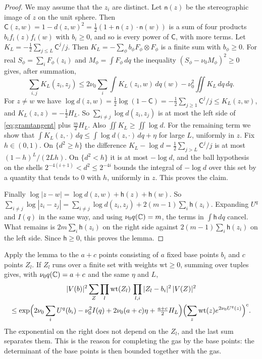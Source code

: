 \begin{proof}
We may assume that the $z_i$ are distinct. Let $\mathsf n(z)$ be the stereographic image of $z$ on the unit sphere. Then
$\mathsf C(z,w)=1-d(z,w)^2=\frac12(1+\mathsf n(z)\cdot\mathsf n(w))$ is a sum of four products $b_if_i(z)f_i(w)$ with $b_i\ge0$, and so
is every power of $\mathsf C$, with more terms. Let $K_L=-\frac12\sum_{j\le L}\mathsf C^j/j$. Then $K_L=-\sum_\phi b_\phi F_\phi\otimes F_\phi$ is a finite sum with
$b_\phi\ge0$. For real $S_\phi=\sum_iF_\phi(z_i)$ and $M_\phi=\int F_\phi\,dq$ the inequality $(S_\phi-\nu_0M_\phi)^2\ge0$ gives, after summation,
\begin{equation}\label{eq:gramtangent}
 \sum_{i,j}K_L(z_i,z_j)\le2\nu_0\sum_i\int K_L(z_i,w)\,dq(w)-\nu_0^2\iint K_L\,dq\,dq .
\end{equation}
For $z\ne w$ we have $\log d(z,w)=\frac12\log(1-\mathsf C)=-\frac12\sum_{j\ge1}\mathsf C^j/j\le K_L(z,w)$, and $K_L(z,z)=-\frac12H_L$. So
$\sum_{i\ne j}\log d(z_i,z_j)$ is at most the left side of \eqref{eq:gramtangent} plus $\frac m2H_L$. Also $\iint K_L\ge\iint\log d$. For the
remaining term we show that $\int K_L(z,\cdot)\,dq\le\int\log d(z,\cdot)\,dq+\eta$ for large $L$, uniformly in $z$. Fix $h\in(0,1)$.
On $\{d^2\ge h\}$ the difference $K_L-\log d=\frac12\sum_{j>L}\mathsf C^j/j$ is at most $(1-h)^L/(2Lh)$. On $\{d^2<h\}$ it is at most $-\log d$, and
the ball hypothesis on the shells $2^{-4(i+1)}<d^2\le2^{-4i}$ bounds the integral of $-\log d$ over this set by a quantity that tends to
$0$ with $h$, uniformly in $z$. This proves the claim.

Finally $\log|z-w|=\log d(z,w)+\mathsf h(z)+\mathsf h(w)$. So $\sum_{i\ne j}\log|z_i-z_j|=\sum_{i\ne j}\log d(z_i,z_j)+2(m-1)\sum_i\mathsf h(z_i)$. Expanding
$U^q$ and $I(q)$ in the same way, and using $\nu_0q(\mathbb C)=m$, the terms in $\int\mathsf h\,dq$ cancel. What remains is
$2m\sum_i\mathsf h(z_i)$ on the right side against $2(m-1)\sum_i\mathsf h(z_i)$ on the left side. Since $\mathsf h\ge0$, this proves the lemma.
\end{proof}

Apply the lemma to the $a+c$ points consisting of $a$ fixed base points $b_i$ and $c$ points $Z_l$. If $Z_l$ runs over a finite set with
weights $\mathrm{wt}\ge0$, summing over tuples gives, with $\nu_0q(\mathbb C)=a+c$ and the same $\eta$ and $L$,
\begin{multline}\label{eq:tangent}
 |V(b)|^2\sum_{Z}\prod_l\mathrm{wt}(Z_l)\,\prod_{l,i}|Z_l-b_i|^2\,|V(Z)|^2\\
 \le\exp\Bigl(2\nu_0\sum_iU^q(b_i)-\nu_0^2I(q)+2\nu_0(a+c)\eta+\tfrac{a+c}2H_L\Bigr)\Bigl(\sum_z\mathrm{wt}(z)e^{2\nu_0U^q(z)}\Bigr)^c .
\end{multline}
The exponential on the right does not depend on the $Z_l$, and the last sum separates them. This is the reason for completing the
gas by the base points: the determinant of the base points is then bounded together with the gas.

